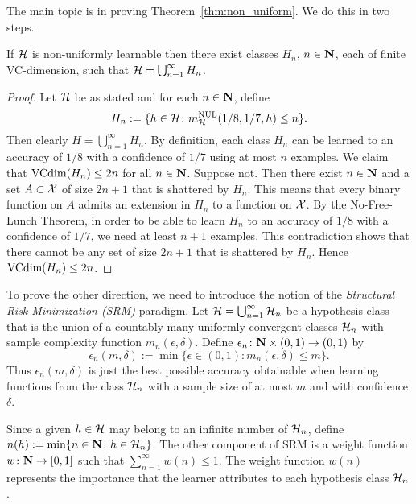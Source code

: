 The main topic is in proving Theorem~\ref{thm:non_uniform}. We do this in two steps.
\begin{lemma}\label{lemma:if_side}
If $\mathcal{H}$ is non-uniformly learnable then there exist classes $H_n$, $n \in \mathbf{N}$, each
of finite VC-dimension, such that $\mathcal{H} = \bigcup_{n = 1}^{\infty} H_n$.
\end{lemma}
\begin{proof}
Let $\mathcal{H}$ be as stated and for each $n \in \mathbf{N}$, define
\[
    H_n := \{h \in \mathcal{H} \colon m_{\mathcal{H}}^{\text{NUL}} (1/8, 1/7, h) \leq n\}.
\]
Then clearly $H = \bigcup_{n = 1}^{\infty} H_n$. By definition, each class $H_n$ 
can be learned to an accuracy of $1/8$ with a confidence of $1/7$ using at most $n$
examples. We claim that $\text{VCdim} (H_n) \leq 2n$ for all 
$n \in \mathbf{N}$. Suppose not. Then there exist $n \in \mathbf{N}$ and a set $A \subset \mathcal{X}$ of size 
$2n + 1$ that is shattered by $H_n$. This means that every binary function on $A$ admits 
an extension in $H_n$ to a function on $\mathcal{X}$. By the No-Free-Lunch Theorem, in order 
to be able to learn $H_n$ to an accuracy of $1/8$ with a confidence of $1/7$, we need 
at least $n + 1$ examples. This contradiction shows that there cannot be any set 
of size $2n + 1$ that is shattered by $H_n$. Hence $\text{VCdim} (H_n) \leq 2n$.
\qedhere
\end{proof}


To prove the other direction, we need to introduce the notion of the \emph{Structural 
Risk Minimization (SRM)} paradigm. Let $\mathcal{H} = \bigcup_{n = 1}^{\infty} \mathcal{H}_n$
be a hypothesis class that is the union of a countably many uniformly convergent 
classes $\mathcal{H}_n$ with sample complexity function 
$m_n (\epsilon, \delta)$. Define $\epsilon_n \colon \mathbf{N} \times (0, 1) \rightarrow (0, 1)$
by
\[
    \epsilon_n (m, \delta) := 
        \min \{\epsilon \in (0, 1) \colon m_n (\epsilon, \delta) \leq m\}.
\]
Thus $\epsilon_n (m, \delta)$ is just the best possible accuracy obtainable 
when learning functions from the class $\mathcal{H}_n$ with a sample size of 
at most $m$ and with confidence $\delta$. 

Since a given $h \in \mathcal{H}$ may belong to an infinite number of $\mathcal{H}_n$,
define $n(h) := \min \{n \in \mathbf{N} \colon h \in \mathcal{H}_n \}$. The other 
component of SRM is a weight function $w \colon \mathbf{N} \rightarrow [0, 1]$ such 
that $\sum_{n = 1}^{\infty} w(n) \leq 1$. The weight function $w(n)$ represents 
the importance that the learner attributes to each hypothesis class $\mathcal{H}_n$.

